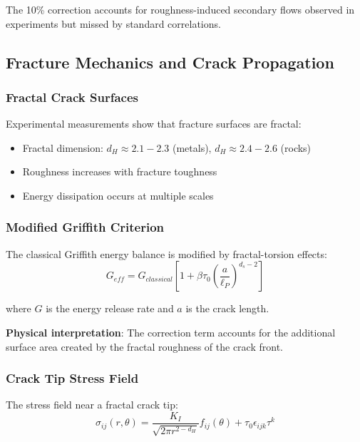 The 10\% correction accounts for roughness-induced secondary flows observed in experiments but missed by standard correlations.

\subsection{Fracture Mechanics and Crack Propagation}

\subsubsection{Fractal Crack Surfaces}

Experimental measurements show that fracture surfaces are fractal:
\begin{itemize}
    \item Fractal dimension: $d_H \approx 2.1-2.3$ (metals), $d_H \approx 2.4-2.6$ (rocks)
    \item Roughness increases with fracture toughness
    \item Energy dissipation occurs at multiple scales
\end{itemize}

\subsubsection{Modified Griffith Criterion}

The classical Griffith energy balance is modified by fractal-torsion effects:
\begin{equation}
    G_{eff} = G_{classical} \left[1 + \beta \tau_0 \left(\frac{a}{\ell_P}\right)^{d_s-2}\right]
\end{equation}

where $G$ is the energy release rate and $a$ is the crack length.

\textbf{Physical interpretation}: The correction term accounts for the additional surface area created by the fractal roughness of the crack front.

\subsubsection{Crack Tip Stress Field}

The stress field near a fractal crack tip:
\begin{equation}
    \sigma_{ij}(r, \theta) = \frac{K_I}{\sqrt{2\pi r^{2-d_H}}} f_{ij}(\theta) + \tau_0 \epsilon_{ijk} \tau^k
\end{equation}

